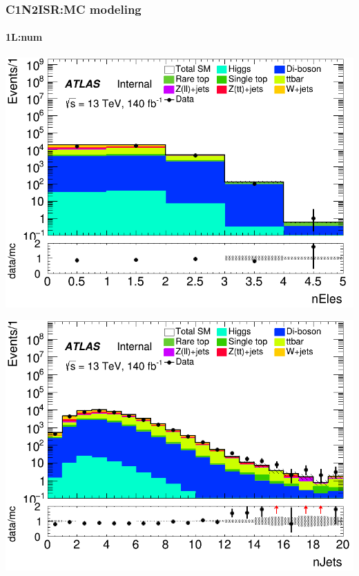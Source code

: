 \documentclass[usenames,dvipsnames]{beamer}
\begin{document}
\begin{frame}
\frametitle{C1N2ISR:MC modeling}
\framesubtitle{1L:\quad num}
    \begin{minipage}{0.32\textwidth}
        \centering
        \includegraphics[width=\textwidth]{graphics/L_met/L_met_nEles.png}
    \end{minipage}
    \hfill
    \begin{minipage}{0.32\textwidth}
        \centering
        \includegraphics[width=\textwidth]{graphics/L_met/L_met_nJets.png}
    \end{minipage}
    \hfill
    \begin{minipage}{0.32\textwidth}
        \centering

\end{minipage}
\end{frame}
\end{document}
